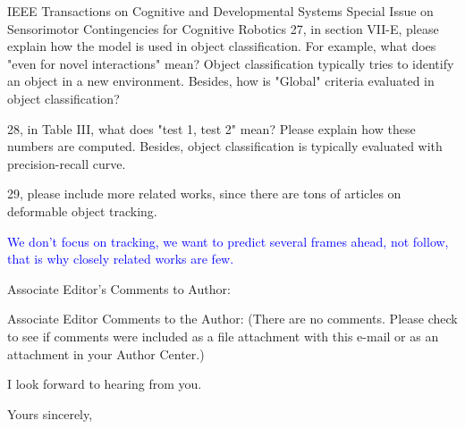 \documentclass[a4paper,12pt]{letter}
\newcommand{\comment}[1]{\textcolor{blue}{#1}}
\begin{document}
\begin{letter}{IEEE Transactions on Cognitive and Developmental Systems\newline
Special Issue on Sensorimotor Contingencies for Cognitive Robotics}
27, in section VII-E, please explain how the model is used in object classification. For example, what does "even for novel interactions" mean? Object classification typically tries to identify an object in a new environment. Besides, how is "Global" criteria evaluated in object classification? 

28, in Table III, what does "test 1, test 2" mean? Please explain how these numbers are computed. Besides, object classification is typically evaluated with precision-recall curve. 

29, please include more related works, since there are tons of articles on deformable object tracking.

\comment{We don't focus on tracking, we want to predict several frames ahead, not follow, that is why closely related works are few.}

Associate Editor's Comments to Author: 

Associate Editor 
Comments to the Author: 
(There are no comments. Please check to see if comments were included as a file attachment with this e-mail or as an attachment in your Author Center.)


I look forward to hearing from you.


\signature{Dra. Verónica Esther Arriola Ríos\\
Profesora Asociada C de T.C.\newline
Departamento de Matemáticas, Cub 119.\newline
Facultad de Ciencias, UNAM \newline
v.arriola@ciencias.unam.mx \newline
+(52)55 5622 5426}

\closing{Yours sincerely,}


\end{letter}
\end{document}
